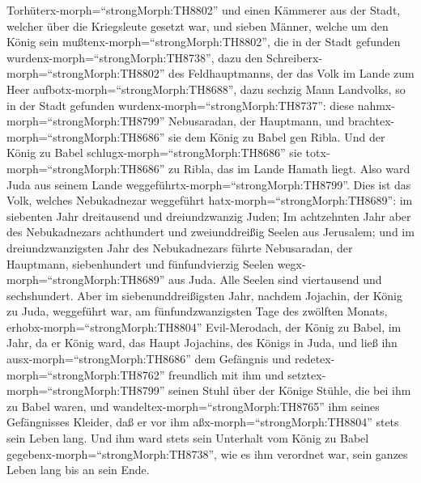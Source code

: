 Torhüterx-morph=``strongMorph:TH8802''  und einen Kämmerer
aus der Stadt, welcher über die Kriegsleute gesetzt war, und sieben
Männer, welche um den König sein mußtenx-morph=``strongMorph:TH8802'',
die in der Stadt gefunden wurdenx-morph=``strongMorph:TH8738'', dazu den
Schreiberx-morph=``strongMorph:TH8802'' des Feldhauptmanns, der das Volk
im Lande zum Heer aufbotx-morph=``strongMorph:TH8688'', dazu sechzig
Mann Landvolks, so in der Stadt gefunden
wurdenx-morph=``strongMorph:TH8737'':  diese
nahmx-morph=``strongMorph:TH8799'' Nebusaradan, der Hauptmann, und
brachtex-morph=``strongMorph:TH8686'' sie dem König zu Babel gen Ribla.
 Und der König zu Babel
schlugx-morph=``strongMorph:TH8686'' sie
totx-morph=``strongMorph:TH8686'' zu Ribla, das im Lande Hamath liegt.
Also ward Juda aus seinem Lande
weggeführtx-morph=``strongMorph:TH8799''.  Dies ist das
Volk, welches Nebukadnezar weggeführt hatx-morph=``strongMorph:TH8689'':
im siebenten Jahr dreitausend und dreiundzwanzig Juden;  Im
achtzehnten Jahr aber des Nebukadnezars achthundert und zweiunddreißig
Seelen aus Jerusalem;  und im dreiundzwanzigsten Jahr des
Nebukadnezars führte Nebusaradan, der Hauptmann, siebenhundert und
fünfundvierzig Seelen wegx-morph=``strongMorph:TH8689'' aus Juda. Alle
Seelen sind viertausend und sechshundert.  Aber im
siebenunddreißigsten Jahr, nachdem Jojachin, der König zu Juda,
weggeführt war, am fünfundzwanzigsten Tage des zwölften Monats,
erhobx-morph=``strongMorph:TH8804'' Evil-Merodach, der König zu Babel,
im Jahr, da er König ward, das Haupt Jojachins, des Königs in Juda, und
ließ ihn ausx-morph=``strongMorph:TH8686'' dem Gefängnis 
und redetex-morph=``strongMorph:TH8762'' freundlich mit ihm und
setztex-morph=``strongMorph:TH8799'' seinen Stuhl über der Könige
Stühle, die bei ihm zu Babel waren,  und
wandeltex-morph=``strongMorph:TH8765'' ihm seines Gefängnisses Kleider,
daß er vor ihm aßx-morph=``strongMorph:TH8804'' stets sein Leben lang.
 Und ihm ward stets sein Unterhalt vom König zu Babel
gegebenx-morph=``strongMorph:TH8738'', wie es ihm verordnet war, sein
ganzes Leben lang bis an sein Ende.

